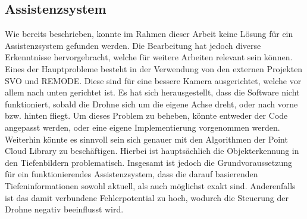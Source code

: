 \subsection{Assistenzsystem}
Wie bereits beschrieben, konnte im Rahmen dieser Arbeit keine Lösung für ein Assistenzsystem gefunden werden. Die Bearbeitung hat jedoch diverse Erkenntnisse hervorgebracht, welche für weitere Arbeiten relevant sein können. \newline
Eines der Hauptprobleme besteht in der Verwendung von den externen Projekten SVO und REMODE. Diese sind für eine bessere Kamera ausgerichtet, welche vor allem nach unten gerichtet ist. Es hat sich herausgestellt, dass die Software nicht funktioniert, sobald die Drohne sich um die eigene Achse dreht, oder nach vorne bzw. hinten fliegt. Um dieses Problem zu beheben, könnte entweder der Code angepasst werden, oder eine eigene Implementierung vorgenommen werden. \newline
Weiterhin könnte es sinnvoll sein sich genauer mit den Algorithmen der Point Cloud Library zu beschäftigen. Hierbei ist hauptsächlich die Objekterkennung in den Tiefenbildern problematisch. \newline
Insgesamt ist jedoch die Grundvoraussetzung für ein funktionierendes Assistenzsystem, dass die darauf basierenden Tiefeninformationen sowohl aktuell, als auch möglichst exakt sind. Anderenfalls ist das damit verbundene Fehlerpotential zu hoch, wodurch die Steuerung der Drohne negativ beeinflusst wird.